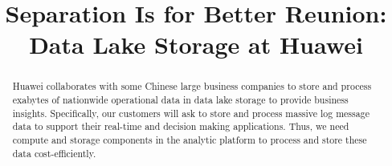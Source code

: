 \documentclass[sigconf, nonacm]{acmart}
\begin{document}
\title{Separation Is for Better Reunion: Data Lake Storage at Huawei}

\iffalse
\author{Ben Trovato}
\affiliation{%
  \institution{Institute for Clarity in Documentation}
  \streetaddress{P.O. Box 1212}
  \city{Dublin}
  \state{Ireland}
  \postcode{43017-6221}
}
\email{trovato@corporation.com}
\fi



\begin{abstract}
Huawei collaborates with some  Chinese large business companies to store and process exabytes of nationwide operational data in data lake storage to provide business insights.  
 Specifically, our customers will ask to store  and process massive  log message data to support their real-time and  decision making applications. Thus, we need compute and storage components in the analytic platform  to process and store these data cost-efficiently. 




 


\end{abstract}
\end{document}
